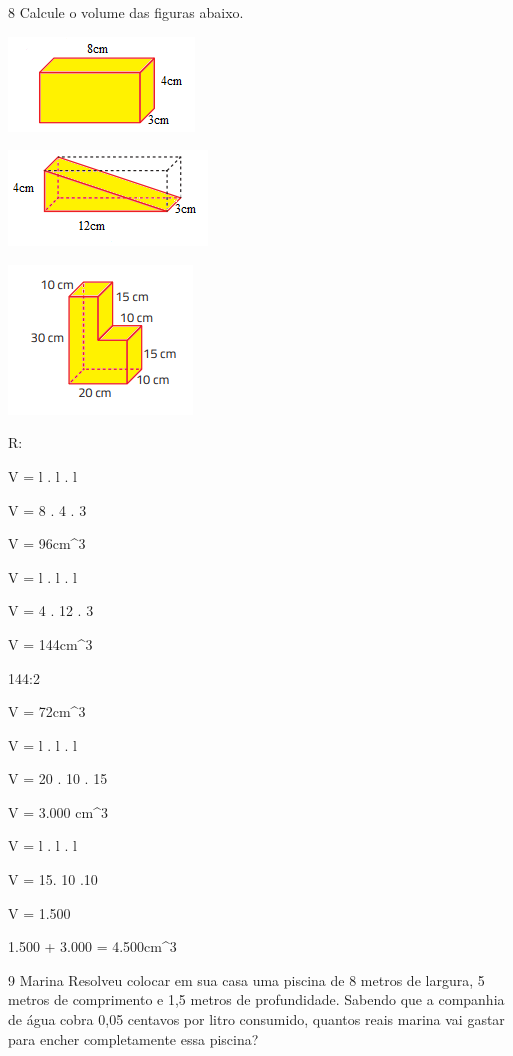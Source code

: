 {\num{8} Calcule o volume das figuras abaixo.
\item
\includegraphics[width=1.94792in,height=0.98958in]{./imgSAEB_8_MAT/media/image51.png}
\item
\includegraphics[width=2.08333in,height=1in]{./imgSAEB_8_MAT/media/image52.png}
\item
\includegraphics[width=1.92708in,height=1.5625in]{./imgSAEB_8_MAT/media/image53.png}

R:
\item

V = l . l . l

V = 8 . 4 . 3

V = 96cm^3
\item

V = l . l . l

V = 4 . 12 . 3

V = 144cm^3

144:2

V = 72cm^3
\item

V = l . l . l

V = 20 . 10 . 15

V = 3.000 cm^3

V = l . l . l

V = 15. 10 .10

V = 1.500

1.500 + 3.000 = 4.500cm^3

\num{9} Marina Resolveu colocar em sua casa uma piscina de 8 metros de
largura, 5 metros de comprimento e 1,5 metros de profundidade. Sabendo
que a companhia de água cobra 0,05 centavos por litro consumido, quantos
reais marina vai gastar para encher completamente essa piscina?

}
